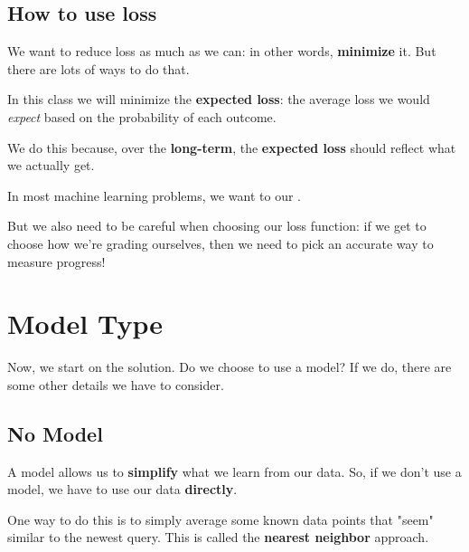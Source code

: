     \subsection{How to use loss}
    
        We want to reduce loss as much as we can: in other words, \textbf{minimize} it. But there are lots of ways to do that. 
        
        In this class we will minimize the \textbf{expected loss}: the average loss we would \textit{expect} based on the probability of each outcome.
        
        We do this because, over the \textbf{long-term}, the \textbf{expected loss} should reflect what we actually get.\\
        
        \begin{concept}
            In most machine learning problems, we want to  our .
        \end{concept}
        
        But we also need to be careful when choosing our loss function: if we get to choose how we're grading ourselves, then we need to pick an accurate way to measure progress!


\pagebreak

\section{Model Type}

    Now, we start on the solution. Do we choose to use a model? If we do, there are some other details we have to consider.
    
    \subsection{No Model}
    
        A model allows us to \textbf{simplify} what we learn from our data. So, if we don't use a model, we have to use our data \textbf{directly}. 
        
        One way to do this is to simply average some known data points that "seem" similar to the newest query. This is called the \textbf{nearest neighbor} approach.
        
